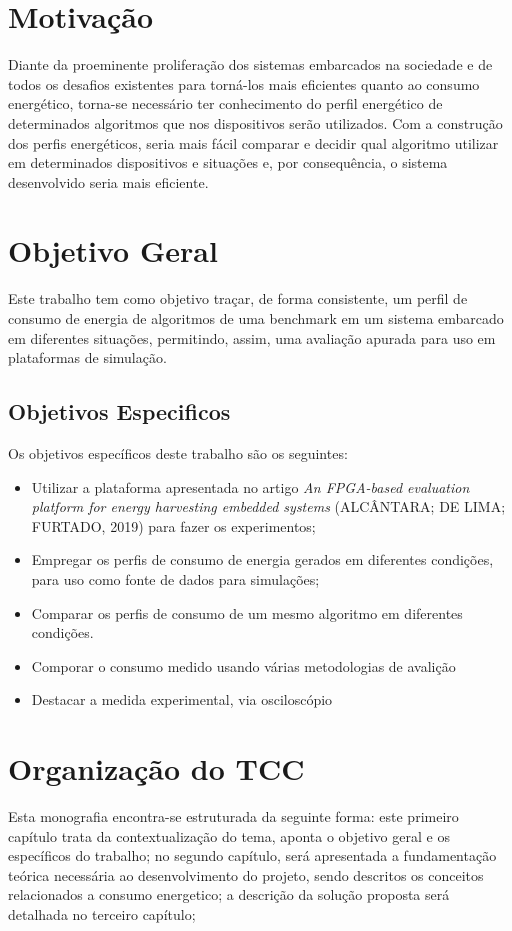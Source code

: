       
\section{Motivação}Diante da proeminente proliferação dos sistemas embarcados na sociedade e de todos os desafios existentes para torná-los mais eficientes quanto ao consumo energético, torna-se necessário ter conhecimento do perfil energético de determinados algoritmos que nos dispositivos serão utilizados. Com a construção dos perfis energéticos, seria mais fácil comparar e decidir qual algoritmo utilizar em determinados dispositivos e situações e, por consequência, o sistema desenvolvido seria mais eficiente.

\section{Objetivo Geral}
Este trabalho tem como objetivo traçar, de forma consistente, um perfil de consumo de energia de algoritmos de uma benchmark em um sistema embarcado em diferentes situações, permitindo, assim, uma avaliação apurada para uso em plataformas de simulação.

\subsection{Objetivos Especificos}
Os objetivos específicos deste trabalho são os seguintes:
\begin{itemize}
    \item 	Utilizar a plataforma apresentada no artigo {\itshape An FPGA-based evaluation platform for energy harvesting embedded systems} (ALCÂNTARA; DE LIMA; FURTADO, 2019) para fazer os experimentos;
    
    \item 	Empregar os perfis de consumo de energia gerados em diferentes condições, para uso como fonte de dados para simulações;
     
     \item 	Comparar os perfis de consumo de um mesmo algoritmo em diferentes condições.
     
     \item Comporar o consumo medido usando várias metodologias de avalição
     
     \item Destacar a medida experimental, via osciloscópio

\end{itemize}



\section{Organização do TCC}

Esta monografia encontra-se estruturada da seguinte forma: este primeiro capítulo
trata da contextualização do tema, aponta o objetivo geral e os específicos do trabalho;
no segundo capítulo, será apresentada a fundamentação teórica necessária ao desenvolvimento do projeto, sendo descritos os conceitos relacionados a consumo energetico; a descrição da solução proposta será detalhada no terceiro capítulo;
